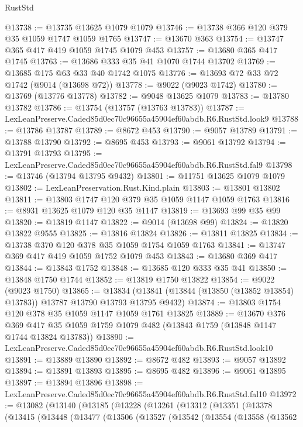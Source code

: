 \begin{lexlean}{RustStd}
\begin{coremodule}
@13738 := @13735 @13625 @1079 @1079
@13746 := @13738 @366 @120 @379 @35 @1059 @1747 @1059 @1765
@13747 := @13670 @363
@13754 := @13747 @365 @417 @419 @1059 @1745 @1079 @453
@13757 := @13680 @365 @417 @1745
@13763 := @13686 @333 @35 @41 @1070 @1744 @13702
@13769 := @13685 @175 @63 @33 @40 @1742 @1075
@13776 := @13693 @72 @33 @72 @1742 (@9014 (@13698 @72))
@13778 := @9022 (@9023 @1742)
@13780 := @13769 (@13776 @13778)
@13782 := @9048 @13625 @1079
@13783 := @13780 @13782
@13786 := @13754 (@13757 (@13763 @13783))
@13787 := LexLeanPreserve.Caded85d0ec70c96655a45904ef60abdb.R6.RustStd.look9
@13788 := @13786 @13787
@13789 := @8672 @453
@13790 := @9057 @13789
@13791 := @13788 @13790
@13792 := @8695 @453
@13793 := @9061 @13792
@13794 := @13791 @13793
@13795 := LexLeanPreserve.Caded85d0ec70c96655a45904ef60abdb.R6.RustStd.fal9
@13798 := @13746 (@13794 @13795 @9432)
@13801 := @11751 @13625 @1079 @1079
@13802 := LexLeanPreservation.Rust.Kind.plain
@13803 := @13801 @13802
@13811 := @13803 @1747 @120 @379 @35 @1059 @1147 @1059 @1763
@13816 := @8931 @13625 @1079 @120 @35 @1147
@13819 := @13693 @99 @35 @99
@13820 := @13819 @1147
@13822 := @9014 (@13698 @99)
@13824 := @13820 @13822 @9555
@13825 := @13816 @13824
@13826 := @13811 @13825
@13834 := @13738 @370 @120 @378 @35 @1059 @1754 @1059 @1763
@13841 := @13747 @369 @417 @419 @1059 @1752 @1079 @453
@13843 := @13680 @369 @417
@13844 := @13843 @1752
@13848 := @13685 @120 @333 @35 @41
@13850 := @13848 @1750 @1744
@13852 := @13819 @1750 @13822
@13854 := @9022 (@9023 @1750)
@13865 := @13834 (@13841 (@13844 (@13850 (@13852 @13854) @13783)) @13787 @13790 @13793 @13795 @9432)
@13874 := @13803 @1754 @120 @378 @35 @1059 @1147 @1059 @1761 @13825
@13889 := @13670
    @376
    @369
    @417
    @35
    @1059
    @1759
    @1079
    @482
    (@13843 @1759 (@13848 @1147 @1744 @13824 @13783))
@13890 := LexLeanPreserve.Caded85d0ec70c96655a45904ef60abdb.R6.RustStd.look10
@13891 := @13889 @13890
@13892 := @8672 @482
@13893 := @9057 @13892
@13894 := @13891 @13893
@13895 := @8695 @482
@13896 := @9061 @13895
@13897 := @13894 @13896
@13898 := LexLeanPreserve.Caded85d0ec70c96655a45904ef60abdb.R6.RustStd.fal10
@13972 := @13082
    (@13140
      (@13185
        (@13228
          (@13261
            (@13312
              (@13351
                (@13378
                  (@13415
                    (@13448
                      (@13477
                        (@13506
                          (@13527
                            (@13542
                              (@13554
                                (@13558
                                  (@13562

\end{coremodule}
\end{lexlean}
